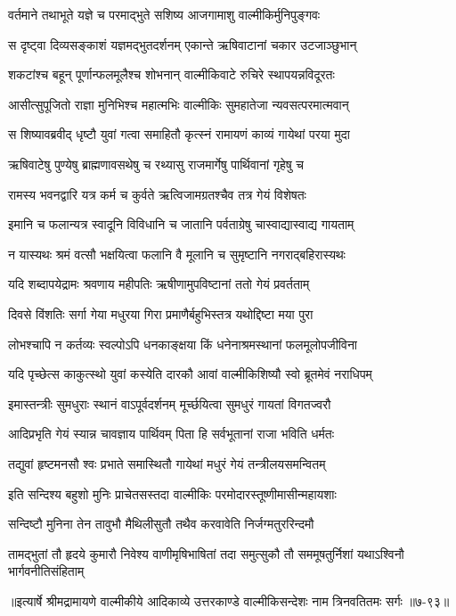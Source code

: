 
\twolineshloka
{वर्तमाने तथाभूते यज्ञे च परमाद्भुते}
{सशिष्य आजगामाशु वाल्मीकिर्मुनिपुङ्गवः} %

\twolineshloka
{स दृष्ट्वा दिव्यसङ्काशं यज्ञमद्भुतदर्शनम्}
{एकान्ते ऋषिवाटानां चकार उटजाञ्छुभान्} %

\twolineshloka
{शकटांश्च बहून् पूर्णान्फलमूलैश्च शोभनान्}
{वाल्मीकिवाटे रुचिरे स्थापयन्नविदूरतः} %

\twolineshloka
{आसीत्सुपूजितो राज्ञा मुनिभिश्च महात्मभिः}
{वाल्मीकिः सुमहातेजा न्यवसत्परमात्मवान्} %

\twolineshloka
{स शिष्यावब्रवीद् धृष्टौ युवां गत्वा समाहितौ}
{कृत्स्नं रामायणं काव्यं गायेथां परया मुदा} %

\twolineshloka
{ऋषिवाटेषु पुण्येषु ब्राह्मणावसथेषु च}
{रथ्यासु राजमार्गेषु पार्थिवानां गृहेषु च} %

\twolineshloka
{रामस्य भवनद्वारि यत्र कर्म च कुर्वते}
{ऋत्विजामग्रतश्चैव तत्र गेयं विशेषतः} %

\twolineshloka
{इमानि च फलान्यत्र स्वादूनि विविधानि च}
{जातानि पर्वताग्रेषु चास्वाद्यास्वाद्य गायताम्} %

\twolineshloka
{न यास्यथः श्रमं वत्सौ भक्षयित्वा फलानि वै}
{मूलानि च सुमृष्टानि नगराद्बहिरास्यथः} %

\twolineshloka
{यदि शब्दापयेद्रामः श्रवणाय महीपतिः}
{ऋषीणामुपविष्टानां ततो गेयं प्रवर्तताम्} %

\twolineshloka
{दिवसे विंशतिः सर्गा गेया मधुरया गिरा}
{प्रमाणैर्बहुभिस्तत्र यथोद्दिष्टा मया पुरा} %

\twolineshloka
{लोभश्चापि न कर्तव्यः स्वल्पोऽपि धनकाङ्क्षया}
{किं धनेनाश्रमस्थानां फलमूलोपजीविना} %

\twolineshloka
{यदि पृच्छेत्स काकुत्स्थो युवां कस्येति दारकौ}
{आवां वाल्मीकिशिष्यौ स्वो ब्रूतमेवं नराधिपम्} %

\twolineshloka
{इमास्तन्त्रीः सुमधुराः स्थानं वाऽपूर्वदर्शनम्}
{मूर्च्छयित्वा सुमधुरं गायतां विगतज्वरौ} %

\twolineshloka
{आदिप्रभृति गेयं स्यान्न चावज्ञाय पार्थिवम्}
{पिता हि सर्वभूतानां राजा भविति धर्मतः} %

\twolineshloka
{तद्युवां हृष्टमनसौ श्वः प्रभाते समास्थितौ}
{गायेथां मधुरं गेयं तन्त्रीलयसमन्वितम्} %

\twolineshloka
{इति सन्दिश्य बहुशो मुनिः प्राचेतसस्तदा}
{वाल्मीकिः परमोदारस्तूष्णीमासीन्महायशाः} %

\twolineshloka
{सन्दिष्टौ मुनिना तेन तावुभौ मैथिलीसुतौ}
{तथैव करवावेति निर्जग्मतुररिन्दमौ} %

\twolineshloka
{तामद्भुतां तौ हृदये कुमारौ निवेश्य वाणीमृषिभाषितां तदा}
{समुत्सुकौ तौ सममूषतुर्निशां यथाऽश्विनौ भार्गवनीतिसंहिताम्} %


॥इत्यार्षे श्रीमद्रामायणे वाल्मीकीये आदिकाव्ये उत्तरकाण्डे वाल्मीकिसन्देशः नाम त्रिनवतितमः सर्गः ॥७-९३॥
